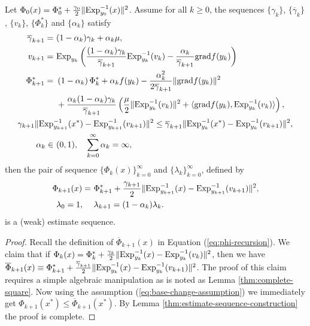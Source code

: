 \begin{lemma} \label{thm:estimate-sequence-lemma}
	Let $\Phi_0(x) = \Phi_0^* + \frac{\gamma_0}{2}\|\mathrm{Exp}_{y_0}^{-1}(x)\|^2$.
	Assume for all $k\ge 0$, the sequences $\{\gamma_k\}$, $\{\overline{\gamma}_k\}$, $\{v_k\}$, $\{\Phi_k^*\}$ and $\{\alpha_k\}$ satisfy
	\begin{align}
	\overline{\gamma}_{k+1} = &~ (1-\alpha_k)\gamma_k + \alpha_k\mu, \label{eq:overline-gamma-k+1}\\
	v_{k+1} = &~ \mathrm{Exp}_{y_k}\left(\frac{(1-\alpha_k)\gamma_k}{\overline{\gamma}_{k+1}} \mathrm{Exp}_{y_k}^{-1}(v_k) - \frac{\alpha_k}{\overline{\gamma}_{k+1}} \mathrm{grad} f(y_k)\right)  \\
	\nonumber \Phi_{k+1}^* = &~ \left(1 - \alpha_k\right) \Phi_k^* + \alpha_k f(y_k) - \frac{\alpha_k^2}{2\overline{\gamma}_{k+1}}\|\mathrm{grad} f(y_k)\|^2 \\
	&~ + \frac{\alpha_k(1-\alpha_k)\gamma_k}{\overline{\gamma}_{k+1}}\left(\frac{\mu}{2}\|\mathrm{Exp}_{y_k}^{-1}(v_k)\|^2 + \langle \mathrm{grad} f(y_k), \mathrm{Exp}_{y_k}^{-1}(v_k)\rangle \right), \label{eq:phi-k+1-star} \\
	\gamma_{k+1} \| \mathrm{Exp}&_{y_{k+1}}^{-1}(x^*) -\mathrm{Exp}_{y_{k+1}}^{-1}(v_{k+1})\|^2 \le \overline{\gamma}_{k+1}\|\mathrm{Exp}_{y_k}^{-1}(x^*)-\mathrm{Exp}_{y_k}^{-1}(v_{k+1})\|^2, \label{eq:base-change-assumption} \\
	\alpha_k\in &~ (0,1), \quad \sum_{k=0}^{\infty} \alpha_k = \infty,
	\end{align}
	then the pair of sequence $\{\Phi_k(x)\}_{k=0}^{\infty}$ and $\{\lambda_k\}_{k=0}^{\infty}$, defined by
	\begin{align}
	\Phi_{k+1}(x) = &~ \Phi_{k+1}^* + \frac{\gamma_{k+1}}{2}\|\mathrm{Exp}_{y_{k+1}}^{-1}(x)-\mathrm{Exp}_{y_{k+1}}^{-1}(v_{k+1})\|^2, \\
	\lambda_0 = 1,  \quad &~ \lambda_{k+1} = (1-\alpha_k)\lambda_k.
	\end{align}
	is a (weak) estimate sequence.
\end{lemma}
\begin{proof} Recall the definition of $\overline{\Phi}_{k+1}(x)$ in Equation (\ref{eq:phi-recursion}). We claim that if $\Phi_k(x) = \Phi_k^* + \frac{\gamma_k}{2}\|\mathrm{Exp}_{y_k}^{-1}(x)-\mathrm{Exp}_{y_k}^{-1}(v_k)\|^2$, then we have $\overline{\Phi}_{k+1}(x) \equiv \Phi_{k+1}^* + \frac{\overline{\gamma}_{k+1}}{2}\|\mathrm{Exp}_{y_k}^{-1}(x)-\mathrm{Exp}_{y_k}^{-1}(v_{k+1})\|^2$. The proof of this claim requires a simple algebraic manipulation as is noted as Lemma \ref{thm:complete-square}. Now using the assumption (\ref{eq:base-change-assumption}) we immediately get $\Phi_{k+1}(x^*)\le\overline{\Phi}_{k+1}(x^*)$. By Lemma \ref{thm:estimate-sequence-construction} the proof is complete.
\end{proof}
